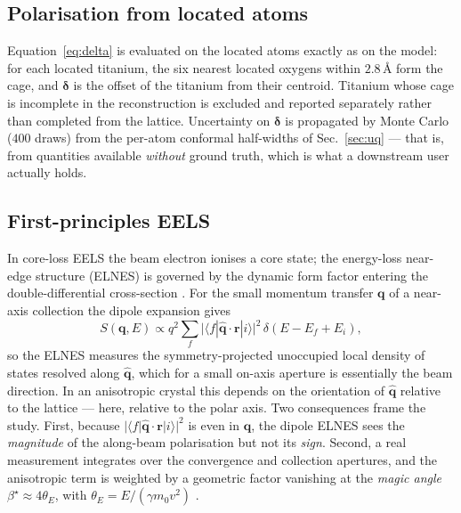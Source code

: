 \documentclass[aps,prb,twocolumn,superscriptaddress,floatfix,nofootinbib]{revtex4-2}
\begin{document}
\subsection{Polarisation from located atoms}

Equation~\eqref{eq:delta} is evaluated on the located atoms exactly as on the model: for each
located titanium, the six nearest located oxygens within $2.8$\,\AA{} form the cage, and
$\boldsymbol{\delta}$ is the offset of the titanium from their centroid. Titanium whose cage is
incomplete in the reconstruction is excluded and reported separately rather than completed from
the lattice. Uncertainty on $\boldsymbol{\delta}$ is propagated by Monte Carlo ($400$ draws)
from the per-atom conformal half-widths of Sec.~\ref{sec:uq} --- that is, from quantities
available \emph{without} ground truth, which is what a downstream user actually holds.

\subsection{First-principles EELS}
\label{sec:eels-method}

In core-loss EELS the beam electron ionises a core state; the energy-loss near-edge structure
(ELNES) is governed by the dynamic form factor entering the double-differential cross-section
\citep{Egerton2011}. For the small momentum transfer $\mathbf{q}$ of a near-axis collection the
dipole expansion gives
\begin{equation}
  S(\mathbf{q},E) \propto q^2 \sum_f
  \big|\langle f| \hat{\mathbf{q}}\cdot\mathbf{r}|i\rangle\big|^2\,\delta(E-E_f+E_i),
  \label{eq:dipole}
\end{equation}
so the ELNES measures the symmetry-projected unoccupied local density of states resolved along
$\hat{\mathbf{q}}$, which for a small on-axis aperture is essentially the beam direction. In an
anisotropic crystal this depends on the orientation of $\hat{\mathbf{q}}$ relative to the
lattice \citep{Nelhiebel1999} --- here, relative to the polar axis. Two consequences frame the
study. First, because $|\langle f|\hat{\mathbf{q}}\cdot\mathbf{r}|i\rangle|^2$ is even in
$\mathbf{q}$, the dipole ELNES sees the \emph{magnitude} of the along-beam polarisation but not
its \emph{sign}. Second, a real measurement integrates over the convergence and collection
apertures, and the anisotropic term is weighted by a geometric factor vanishing at the
\emph{magic angle} $\beta^\star\approx4\theta_E$, with $\theta_E=E/(\gamma m_0v^2)$
\citep{Jouffrey2004}.
\end{document}
